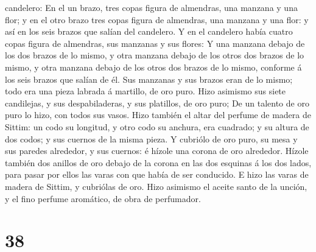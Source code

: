 candelero:  En el un brazo, tres copas figura de
almendras, una manzana y una flor; y en el otro brazo tres copas figura
de almendras, una manzana y una flor: y así en los seis brazos que
salían del candelero.  Y en el candelero había cuatro
copas figura de almendras, sus manzanas y sus flores:  Y
una manzana debajo de los dos brazos de lo mismo, y otra manzana debajo
de los otros dos brazos de lo mismo, y otra manzana debajo de los otros
dos brazos de lo mismo, conforme á los seis brazos que salían de él.
 Sus manzanas y sus brazos eran de lo mismo; todo era una
pieza labrada á martillo, de oro puro.  Hizo asimismo sus
siete candilejas, y sus despabiladeras, y sus platillos, de oro puro;
 De un talento de oro puro lo hizo, con todos sus vasos.
 Hizo también el altar del perfume de madera de Sittim:
un codo su longitud, y otro codo su anchura, era cuadrado; y su altura
de dos codos; y sus cuernos de la misma pieza.  Y
cubriólo de oro puro, su mesa y sus paredes alrededor, y sus cuernos: é
hízole una corona de oro alrededor.  Hízole también dos
anillos de oro debajo de la corona en las dos esquinas á los dos lados,
para pasar por ellos las varas con que había de ser conducido.
 E hizo las varas de madera de Sittim, y cubriólas de
oro.  Hizo asimismo el aceite santo de la unción, y el
fino perfume aromático, de obra de perfumador.

\hypertarget{section-37}{%
\section{38}\label{section-37}}

